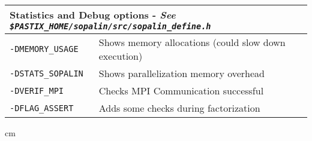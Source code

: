 \documentclass{article}
\newenvironment{tabIII}{\begin{tabular}{|p{32mm}|p{90mm}|}}{\end{tabular}}
\newcommand*{\tabIIItitle}[1]{\multicolumn{2}{|l|}{#1}}
\begin{document}
\begin{multicols}{2}
  \begin{tabIII}
    \hline
    \tabIIItitle{Statistics and Debug options - \textit{See \texttt{\$PASTIX\_HOME/sopalin/src/sopalin\_define.h}}}\\
    \hline
    \texttt{-DMEMORY\_USAGE}   & Shows memory allocations (could slow down execution)\\
    \texttt{-DSTATS\_SOPALIN}  & Shows parallelization memory overhead\\
    \texttt{-DVERIF\_MPI}      & Checks MPI Communication successful\\
    \texttt{-DFLAG\_ASSERT}    & Adds some checks during factorization\\
    \hline
  \end{tabIII}
 cm


  


  \newpage
  
\end{multicols}
\end{document}

